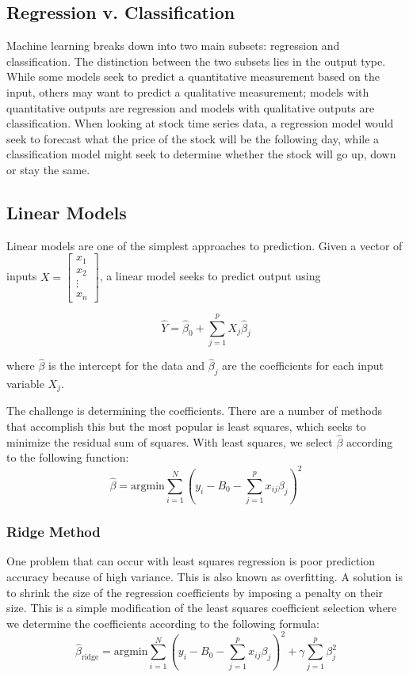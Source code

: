 \documentclass[12pt]{article}
\begin{document}
\subsection{Regression v. Classification}
Machine learning breaks down into two main subsets: regression and classification. The distinction between the two subsets lies in the output type. While some models seek to predict a quantitative measurement based on the input, others may want to predict a qualitative measurement; models with quantitative outputs are regression and models with qualitative outputs are classification. \cite[9-10]{springer} When looking at stock time series data, a regression model would seek to forecast what the price of the stock will be the following day, while a classification model might seek to determine whether the stock will go up, down or stay the same. 

\subsection{Linear Models}
Linear models are one of the simplest approaches to prediction. Given a vector of inputs 
$X =  \begin{bmatrix} 
x_1 \\
x_2 \\
\vdots \\
x_n
\end{bmatrix}
$, a linear model seeks to predict output using 

$$\hat{Y} = \hat{\beta}_0 + \sum_{j=1}^{p} X_j \hat{\beta}_j$$

where $\hat{\beta}$ is the intercept for the data and $\hat{\beta}_j$ are the coefficients for each input variable $X_j$. \cite[11]{springer}

The challenge is determining the coefficients. There are a number of methods that accomplish this but the most popular is least squares, which seeks to minimize the residual sum of squares. 
With least squares, we select $\hat{\beta}$ according to the following function:
$$\hat{\beta} = \text{argmin} \sum_{i=1}^{N} (y_i - B_0 - \sum_{j=1}^{p} x_{ij} \beta_j)^2$$
\cite[42]{springer}


\subsubsection{Ridge Method}
One problem that can occur with least squares regression is poor prediction accuracy because of high variance. \cite[55]{springer} This is also known as overfitting. A solution is to shrink the size of the regression coefficients by imposing a penalty on their size. This is a simple modification of the least squares coefficient selection where we determine the coefficients according to the following formula: 
$$\hat{\beta}_{\text{ridge}} = \text{argmin} \sum_{i=1}^{N} (y_i - B_0 - \sum_{j=1}^{p} x_{ij} \beta_j)^2 + \gamma \sum_{j=1}^{p}\beta_j^2$$
\cite[59]{springer}
\end{document}
